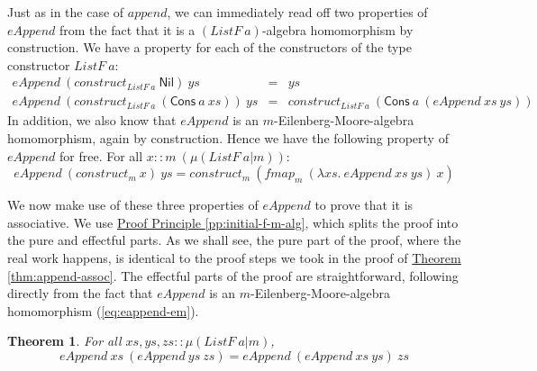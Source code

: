\documentclass{jfp1}
\newtheorem{theorem}{Theorem}
\newcommand{\proofprinref}[1]{\hyperref[#1]{Proof Principle \ref*{#1}}}
\newcommand{\thmref}[1]{\hyperref[#1]{Theorem \ref*{#1}}}
\begin{document}
Just as in the case of $\mathit{append}$, we can immediately read off
two properties of $\mathit{eAppend}$ from the fact that it is a
$(\mathit{ListF}~a)$-algebra homomorphism by construction. We have a
property for each of the constructors of the type constructor
$\mathit{ListF}~a$:
\begin{eqnarray}
  \label{eq:eAppend-nil}
  \mathit{eAppend}~(\mathit{construct}_{\mathit{ListF}~a}~\mathsf{Nil})~\mathit{ys} & = & \mathit{ys} \\
  \label{eq:eAppend-cons}
  \mathit{eAppend}~(\mathit{construct}_{\mathit{ListF}~a}~(\mathsf{Cons}~a~\mathit{xs}))~\mathit{ys} & = & \mathit{construct}_{\mathit{ListF}~a}~(\mathsf{Cons}~a~(\mathit{eAppend}~\mathit{xs}~\mathit{ys}))
\end{eqnarray}
In addition, we also know that $\mathit{eAppend}$ is an
$m$-Eilenberg-Moore-algebra homomorphism, again by construction. Hence
we have the following property of $\mathit{eAppend}$ for free. For all
$x :: m~(\mu(\mathit{ListF}~a|m))$:
\begin{equation}\label{eq:eappend-em}
  \mathit{eAppend}~(\mathit{construct}_m~\mathit{x})~\mathit{ys} = \mathit{construct}_m~(\mathit{fmap}_m~(\lambda \mathit{xs}.~\mathit{eAppend}~\mathit{xs}~\mathit{ys})~\mathit{x})
\end{equation}

We now make use of these three properties of $\mathit{eAppend}$ to
prove that it is associative. We use
\proofprinref{pp:initial-f-m-alg}, which splits the proof into the
pure and effectful parts. As we shall see, the pure part of the proof,
where the real work happens, is identical to the proof steps we took
in the proof of \thmref{thm:append-assoc}. The effectful parts of the
proof are straightforward, following directly from the fact that
$\mathit{eAppend}$ is an $m$-Eilenberg-Moore-algebra homomorphism
(\autoref{eq:eappend-em}).

\begin{theorem}
  For all $\mathit{xs}, \mathit{ys}, \mathit{zs} :: \mu(\mathit{ListF}~a|m)$,
  \begin{displaymath}
    \mathit{eAppend}~\mathit{xs}~(\mathit{eAppend}~\mathit{ys}~\mathit{zs}) = \mathit{eAppend}~(\mathit{eAppend}~\mathit{xs}~\mathit{ys})~\mathit{zs}
  \end{displaymath}
\end{theorem}
\end{document}
